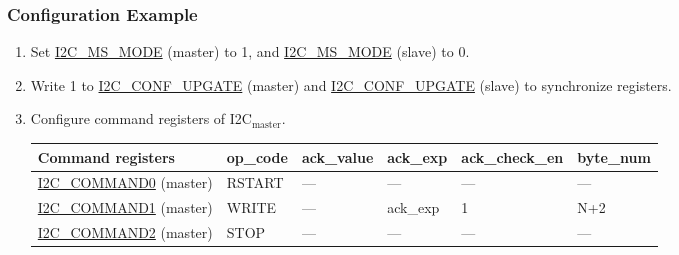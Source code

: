 \documentclass[main\_\_EN.tex]{subfiles}
\begin{document}
\subsubsection{Configuration Example}
\begin{enumerate}
\item Set \hyperref[fielddesc:I2CMSMODE]{I2C\_MS\_MODE} (master) to 1, and \hyperref[fielddesc:I2CMSMODE]{I2C\_MS\_MODE} (slave) to 0.
\item Write 1 to \hyperref[fielddesc:I2CCONFUPGATE]{I2C\_CONF\_UPGATE} (master) and \hyperref[fielddesc:I2CCONFUPGATE]{I2C\_CONF\_UPGATE} (slave) to synchronize registers.
\item Configure command registers of I2C$_\text{master}$.

\begin{longtable}{ | p{4cm} | p{2cm} | p{2cm} | p{2cm} |p{2cm} | p{2cm} |}
\hline\rowcolor{lightgray}
Command registers& op\_code & ack\_value&ack\_exp&ack\_check\_en&byte\_num  \\ \hline
\hyperref[fielddesc:I2CCOMMAND0]{I2C\_COMMAND0} (master)& RSTART& ---&---&---&---  \\ \hline
\hyperref[fielddesc:I2CCOMMAND1]{I2C\_COMMAND1} (master)& WRITE& ---&ack\_exp&1&N+2  \\ \hline
\hyperref[fielddesc:I2CCOMMAND2]{I2C\_COMMAND2} (master)& STOP& ---&---&---&---  \\ \hline
\end{longtable}


\end{enumerate}
\end{document}
